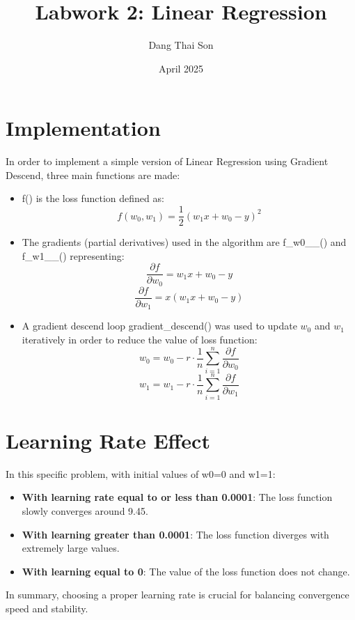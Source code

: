 \documentclass{article}
\title{Labwork 2: Linear Regression}
\author{Dang Thai Son}
\date{April 2025}
\begin{document}
\maketitle

\section{Implementation}
In order to implement a simple version of Linear Regression using Gradient Descend, three main functions are made: 

\begin{itemize}
    \item f() is the loss function defined as:
    \[
    f(w_0, w_1) = \frac{1}{2}(w_1 x + w_0 - y)^2
    \]
    \item The gradients (partial derivatives) used in the algorithm are f\_w0\_\_() and f\_w1\_\_() representing:
    \[
    \frac{\partial f}{\partial w_0} = w_1 x + w_0 - y
    \]
    \[
    \frac{\partial f}{\partial w_1} = x(w_1 x + w_0 - y)
    \]
    \item A gradient descend loop gradient\_descend() was used to update $w_0$ and $w_1$ iteratively in order to reduce the value of loss function:
    \[
    w_0 = w_0 - r \cdot \frac{1}{n} \sum_{i=1}^{n} \frac{\partial f}{\partial w_0}
    \]
    \[
    w_1 = w_1 - r \cdot \frac{1}{n} \sum_{i=1}^{n} \frac{\partial f}{\partial w_1}
    \]
\end{itemize}

\section{Learning Rate Effect}
In this specific problem, with initial values of w0=0 and w1=1:

\begin{itemize}
    \item \textbf{With learning rate equal to or less than 0.0001}: The loss function slowly converges around 9.45.
    \item \textbf{With learning greater than 0.0001}: The loss function diverges with extremely large values.
    \item \textbf{With learning equal to 0}: The value of the loss function does not change.
\end{itemize}

In summary, choosing a proper learning rate is crucial for balancing convergence speed and stability.
\end{document}

